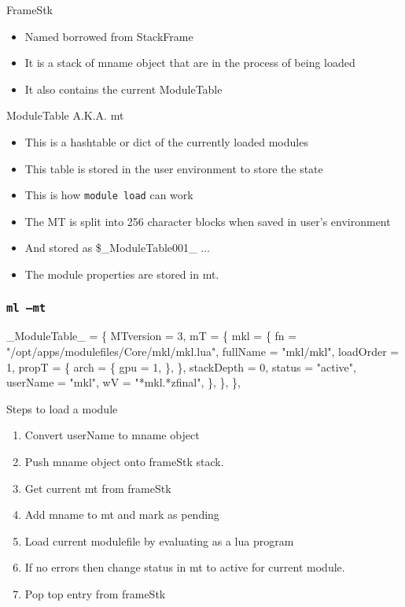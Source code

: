 \documentclass{beamer}
\begin{document}
\begin{frame}{FrameStk}
  \begin{itemize}
    \item Named borrowed from StackFrame 
    \item It is a stack of mname object that are in the process of
      being loaded
    \item It also contains the current ModuleTable
  \end{itemize}
\end{frame}

\begin{frame}{ModuleTable A.K.A. mt}
  \begin{itemize}
    \item This is a hashtable or dict of the currently loaded modules
    \item This table is stored in the user environment to store the
      state
    \item This is how {\color{blue}\texttt{module load}} can work
    \item The MT is split into 256 character blocks when saved in
      user's environment
    \item And stored as \$\_ModuleTable001\_ ...
    \item The module properties are stored in mt.
  \end{itemize}
\end{frame}

\begin{frame}[fragile]
  \frametitle{\texttt{ml --mt}}
    {\tiny
\begin{semiverbatim}
\_ModuleTable\_ = \{
  MTversion = 3,
  mT = \{
   mkl = \{
      fn = "/opt/apps/modulefiles/Core/mkl/mkl.lua",
      fullName = "mkl/mkl",
      loadOrder = 1,
      propT = \{
        arch = \{
          gpu = 1,
        \},
      \},
      stackDepth = 0,
      status = "active",
      userName = "mkl",
      wV = "*mkl.*zfinal",
    \},
  \},
\},
\end{semiverbatim}
    }
\end{frame}

\begin{frame}{Steps to load a module}
  \begin{enumerate}
    \item Convert userName to mname object
    \item Push mname object onto frameStk stack.
    \item Get current mt from frameStk
    \item Add mname to mt and mark as {\color{blue} pending}
    \item Load current modulefile by evaluating as a lua program
    \item If no errors then change status in mt to {\color{blue}
        active} for current module.
    \item Pop top entry from frameStk
  \end{enumerate}
\end{frame}
\end{document}
